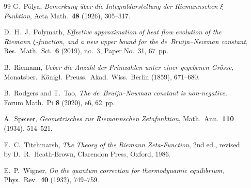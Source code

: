 \documentclass[11pt,reqno]{amsart}
\theoremstyle{plain}
\theoremstyle{definition}
\theoremstyle{remark}
\numberwithin{equation}{section}
\begin{document}
\begin{thebibliography}{99}
G.~P\'olya, \emph{Bemerkung \"uber die Integraldarstellung der Riemannschen $\xi$-Funktion}, Acta Math.\ \textbf{48} (1926), 305--317.

D.~H.~J.~Polymath, \emph{Effective approximation of heat flow evolution of the Riemann $\xi$-function, and a new upper bound for the de~Bruijn--Newman constant}, Res.\ Math.\ Sci.\ \textbf{6} (2019), no.~3, Paper No.~31, 67~pp.

B.~Riemann, \emph{Ueber die Anzahl der Primzahlen unter einer gegebenen Gr\"osse}, Monatsber.\ K\"onigl.\ Preuss.\ Akad.\ Wiss.\ Berlin (1859), 671--680.

B.~Rodgers and T.~Tao, \emph{The de~Bruijn--Newman constant is non-negative}, Forum Math.\ Pi \textbf{8} (2020), e6, 62~pp.

A.~Speiser, \emph{Geometrisches zur Riemannschen Zetafunktion}, Math.\ Ann.\ \textbf{110} (1934), 514--521.

E.~C.~Titchmarsh, \emph{The Theory of the Riemann Zeta-Function}, 2nd ed., revised by D.~R.~Heath-Brown, Clarendon Press, Oxford, 1986.

E.~P.~Wigner, \emph{On the quantum correction for thermodynamic equilibrium}, Phys.\ Rev.\ \textbf{40} (1932), 749--759.

\end{thebibliography}
\end{document}
